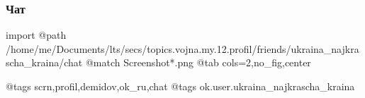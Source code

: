  
 
 
 
 

\subsubsection{Чат}

\ifcmt
  import
  @path /home/me/Documents/lts/secs/topics.vojna.my.12.profil/friends/ukraina_najkrascha_kraina/chat
  @match Screenshot*.png
  @tab cols=2,no_fig,center

  @tags scrn,profil,demidov,ok_ru,chat
  @tags ok.user.ukraina_najkrascha_kraina

\fi
